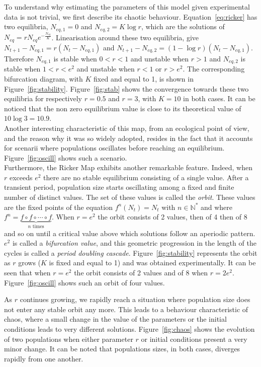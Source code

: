 \documentclass[12pt]{article}
\begin{document}
	To understand why estimating the parameters of this model given experimental data is not trivial, we first describe its chaotic behaviour. Equation~\ref{eq:ricker} has two equilibria, $N_{eq, 1} = 0$ and $N_{eq, 2} = K\log r$, which are the solutions of  $N_{eq} = r N_{eq} e^{-\frac{N_{eq}}{K}}$. Linearisation around these two equilibria, give $N_{t+1} - N_{eq, 1} = r(N_{t} - N_{eq, 1})$ and $N_{t+1} - N_{eq, 2} = (1-\log r)(N_{t} - N_{eq, 1})$. Therefore $N_{eq, 1}$ is stable when $0 < r < 1$ and unstable when $r > 1$ and $N_{eq, 2}$ is stable when $1 < r < e^2$ and unstable when $r < 1$ or $r > e^2$. The corresponding bifurcation diagram, with $K$ fixed and equal to 1, is shown in Figure~\ref{fig:stability}. Figure~\ref{fig:stab} shows the convergence towards these two equilibria for respectively $r=0.5$ and $r=3$, with $K=10$ in both cases. It can be noticed that the non zero equilibrium value is close to its theoretical value of $10 \log 3 = 10.9$. \\
	Another interesting characteristic of this map, from an ecological point of view, and the reason why it was so widely adopted, resides in the fact that it accounts for scenarii where populations oscillates before reaching an equilibrium. Figure~\ref{fig:oscill} shows such a scenario.\\
	
	Furthermore, the Ricker Map exhibits another remarkable feature. Indeed, when $r$ exceeds $e^2$ there are no stable equilibrium consisting of a single value. After a transient period, population size starts oscillating among a fixed and finite number of distinct values. The set of these values is called the \emph{orbit}. These values are the fixed points of the equation $f^n(N_t) = N_t$ with $n \in \mathbb{N^*}$ and where $f^n = \underbrace{f\circ f\circ \cdots \circ f}_{n\text{\ times}}$. When $r=e^2$ the orbit consists of 2 values, then of 4 then of 8 and so on until a critical value above which solutions follow an aperiodic pattern. $e^2$ is called a \emph{bifurcation value}, and this geometric progression in the length of the cycles is called a \emph{period doubling cascade}. Figure~\ref{fig:stability} represents the orbit as $r$ grows ($K$ is fixed and equal to 1) and was obtained experimentally. It can be seen that when $r=e^2$ the orbit consists of 2 values and of 8 when $r=2e^2$. Figure~\ref{fig:oscill} shows such an orbit of four values.
	
	As $r$ continues growing, we rapidly reach a situation where population size does not enter any stable orbit any more. This leads to a behaviour characteristic of chaos, where a small change in the value of the parameters or the initial conditions leads to very different solutions. Figure~\ref{fig:chaos} shows the evolution of two populations when either parameter $r$ or initial conditions present a very minor change. It can be noted that populations sizes, in both cases, diverges rapidly from one another.
	
\end{document}
